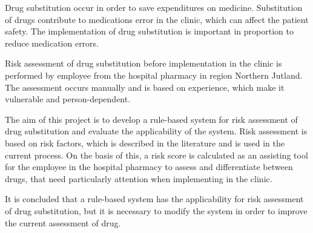 \vspace{-0.3cm}
Drug substitution occur in order to save expenditures on medicine. Substitution of drugs contribute to medications error in the clinic, which can affect the patient safety. The implementation of drug substitution is important in proportion to reduce medication errors. 

Risk assessment of drug substitution before implementation in the clinic is performed by employee from the hospital pharmacy in region Northern Jutland. The assessment occurs manually and is based on experience, which make it vulnerable and person-dependent.

The aim of this project is to develop a rule-based system for risk assessment of drug substitution and evaluate the applicability of the system. Risk assessment is based on risk factors, which is described in the literature and is used in the current process. On the basis of this, a risk score is calculated as an assisting tool for the employee in the hospital pharmacy to assess and differentiate between drugs, that need particularly attention when implementing in the clinic. 

It is concluded that a rule-based system has the applicability for risk assessment of drug substitution, but it is necessary to modify the system in order to improve the current assessment of drug.
\vspace{-0.2cm}